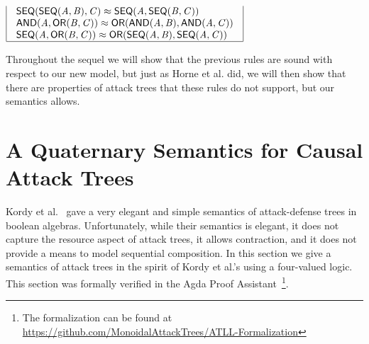 \documentclass{llncs}
\newcommand{\ATermsnt}[1]{\mathit{#1}}
\begin{document}
\begin{definition}
\begin{center}
\begin{math}
\begin{array}{|l|l|}
\begin{array}{lll}
            \mathsf{SEQ}(  \mathsf{SEQ}( \ATermsnt{A} , \ATermsnt{B} )  , \ATermsnt{C} )   \approx   \mathsf{SEQ}( \ATermsnt{A} ,  \mathsf{SEQ}( \ATermsnt{B} , \ATermsnt{C} )  )  \\                
            \mathsf{AND}( \ATermsnt{A} ,  \mathsf{OR}( \ATermsnt{B} , \ATermsnt{C} )  )   \approx   \mathsf{OR}(  \mathsf{AND}( \ATermsnt{A} , \ATermsnt{B} )  ,  \mathsf{AND}( \ATermsnt{A} , \ATermsnt{C} )  )  \\
            \mathsf{SEQ}( \ATermsnt{A} ,  \mathsf{OR}( \ATermsnt{B} , \ATermsnt{C} )  )   \approx   \mathsf{OR}(  \mathsf{SEQ}( \ATermsnt{A} , \ATermsnt{B} )  ,  \mathsf{SEQ}( \ATermsnt{A} , \ATermsnt{C} )  )  \\
        \end{array}\\
        \hline
      \end{array}
    \end{math}  
  \end{center}
\end{definition}
Throughout the sequel we will show that the previous rules are sound
with respect to our new model, but just as Horne et
al. \cite{horne2017semantics} did, we will then show that there are
properties of attack trees that these rules do not support, but our
semantics allows.



\vspace{-7px}
\section{A Quaternary Semantics for Causal Attack Trees}
\label{sec:a_quaternary_semantics_for_causal_attack_trees}
\newcommand{\forth}{\frac{1}{4}}
\newcommand{\half}{\frac{1}{2}}

Kordy et al.~\cite{Kordy:2012} gave a very elegant and simple
semantics of attack-defense trees in boolean algebras.  Unfortunately,
while their semantics is elegant, it does not capture the resource
aspect of attack trees, it allows contraction, and it does not provide
a means to model sequential composition.  In this section we give a
semantics of attack trees in the spirit of Kordy et al.'s using a
four-valued logic.  This section was formally verified in the Agda
Proof Assistant~\cite{Norell:2009}\footnote{The formalization can be
  found at
  \url{https://github.com/MonoidalAttackTrees/ATLL-Formalization}}.
\end{document}
